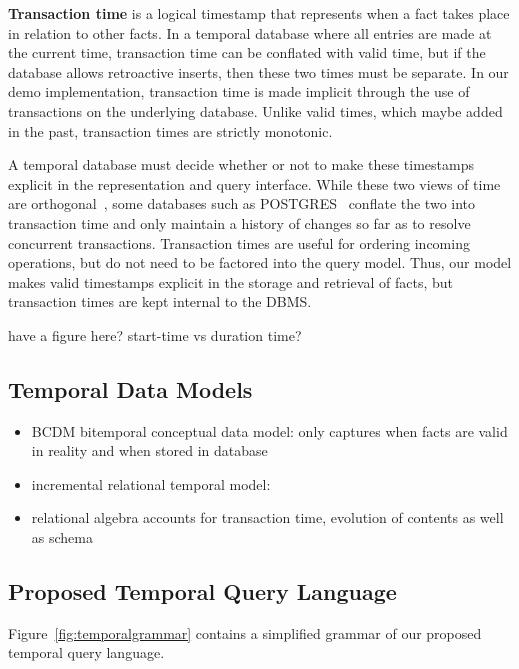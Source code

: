\textbf{Transaction time} is a logical timestamp that represents when a fact
takes place in relation to other facts. In a temporal database where all
entries are made at the current time, transaction time can be conflated with
valid time, but if the database allows retroactive inserts, then these two
times must be separate. In our demo implementation, transaction time is made
implicit through the use of transactions on the underlying database. Unlike
valid times, which maybe added in the past, transaction times are strictly
monotonic.

A temporal database must decide whether or not to make these timestamps
explicit in the representation and query interface.  While these two views of
time are orthogonal~\cite{snodgrass1986temporal}, some databases such as
POSTGRES~\cite{stonebraker1990implementation} conflate the two into transaction
time and only maintain a history of changes so far as to resolve concurrent
transactions. Transaction times are useful for ordering incoming operations,
but do not need to be factored into the query model. Thus, our model makes
valid timestamps explicit in the storage and retrieval of facts, but
transaction times are kept internal to the DBMS.

have a figure here? start-time vs duration time?
\fi

\subsection{Temporal Data Models}

\begin{itemize}
\item BCDM bitemporal conceptual data model: only captures when facts are valid in reality and when stored in database~\cite{jensen1996semantics}\cite{jensen1994unifying}
\item incremental relational temporal model: \cite{jensen1991incremental}
\item relational algebra accounts for transaction time, evolution of contents as well as schema~\cite{mckenzie1990schema}
\end{itemize}

\subsection{Proposed Temporal Query Language}

Figure~\ref{fig:temporalgrammar} contains a simplified grammar of our proposed temporal query language.

